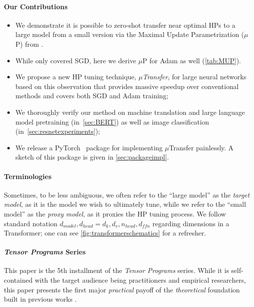 \documentclass{article}
\theoremstyle{definition}
\begin{document}
\newpage

\paragraph{Our Contributions}
\begin{itemize}
    \item We demonstrate it is possible to zero-shot transfer near optimal HPs to a large model from a small version via the Maximal Update Parametrization ($\mu$P) from \citep{TP4}.
    \item While \citep{TP4} only covered SGD, here we derive $\mu$P for Adam as well (\cref{tab:MUP}).
    \item We propose a new HP tuning technique, \emph{$\mu$Transfer}, for large neural networks based on this observation that provides massive speedup over conventional methods and covers both SGD and Adam training;
    \item We thoroughly verify our method on machine translation and large language model pretraining (in~\cref{sec:BERT}) as well as image classification (in~\cref{sec:resnetexperiments});
    \item We release a PyTorch~\citep{pytorch} package for implementing $\mu$Transfer painlessly.
    A sketch of this package is given in \cref{sec:packageimpl}.
\end{itemize}

\paragraph{Terminologies}
Sometimes, to be less ambiguous, we often refer to the ``large model'' as the \emph{target model}, as it is the model we wish to ultimately tune, while we refer to the ``small model'' as the \emph{proxy model}, as it proxies the HP tuning process.
We follow standard notation $d_{model}, d_{head} = d_k, d_v, n_{head}, d_{ffn}$ regarding dimensions in a Transformer; one can see \cref{fig:transformerschematics} for a refresher.

\paragraph{\emph{Tensor Programs} Series}
This paper is the 5th installment of the \emph{Tensor Programs} series.
While it is self-contained with the target audience being practitioners and empirical researchers, this paper presents the first major \emph{practical} payoff of the \emph{theoretical} foundation built in previous works \citep{scaling,TP1,TP2,TP2b,TP3,TP4}.
\end{document}
